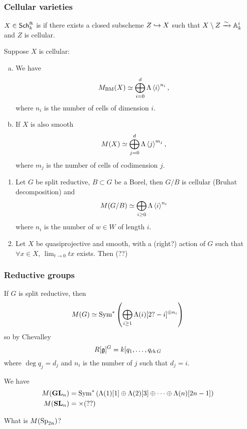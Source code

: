 \subsubsection{Cellular varieties}
\begin{definition}
$X\in \mathsf{Sch}_k^{\text{ft}}$ is  if there exists a closed subscheme $Z\hookrightarrow
X$ such that $X\setminus Z\xrightarrow{\sim} \mathbb A_k^{i}$ and $Z$ is cellular.
\end{definition}
\begin{proposition}
Suppose $X$ is cellular:
\begin{enumerate}[a)]
\item We have
\[
M_{\text{BM}}(X) \simeq \bigoplus_{i=0}^{d}\Lambda\left<i \right>^{n_i},
\]
where $n_i$ is the number of cells of dimension $i$.
\item If $X$ is also smooth
\[
M(X) \simeq \bigoplus_{j=0}^{d}\Lambda\left<j \right>^{m_j},
\]
where $m_j$ is the number of cells of codimension $j$.
\end{enumerate}
\end{proposition}
\begin{example}\leavevmode
\begin{enumerate}[1)]
\item Let $G$ be split reductive, $B\subset G$ be a Borel, then $G /B$ is cellular
(Bruhat decomposition) and
\[
M(G /B) \simeq \bigoplus_{i\ge 0}\Lambda\left<i \right>^{n_i}
\]
where $n_i$ is the number of $w\in W$ of length $i$.
\item Let $X$ be quasiprojective and smooth, with a (right?) action of $G$ such that
$\forall x\in X$, $\lim_{t\to 0} tx$ exists. Then (??) %
\end{enumerate}
\end{example}
\subsubsection{Reductive groups}
\begin{theorem}[Biglami]
If $G$ is split reductive, then
\[
M(G) \isoto \Sym^{*}\left( \bigoplus_{i\ge 1}\Lambda(i)[2?-i]^{\oplus n_i} \right) %
\]
so by Chevalley
\[
R[\mathfrak{g}]^{G} = k[q_1,\dots,q_{\operatorname{rk} G}
\]
where $\deg q_j = d_j$ and $n_i$ is the number of $j$ such that $d_j=i$.
\end{theorem}
\begin{example}
We have
\begin{align*}
M(\GL_n) &= \Sym^{*}\left( \Lambda(1)[1] \oplus \Lambda(2)[3]\oplus \dots\oplus
\Lambda(n)[2n-1] \right)  \\
M(\SL_n) &= \times  (??) %
\end{align*}
\end{example}
\begin{exercise}
What is $M(\operatorname{Sp}_{2n})$?
\end{exercise}

